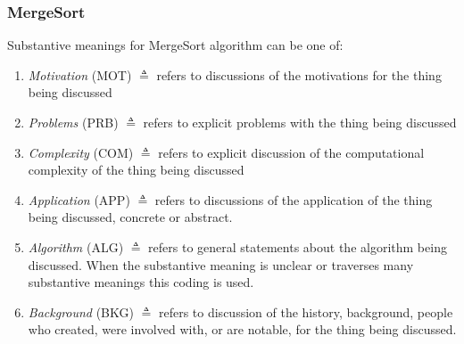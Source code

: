 \documentclass[10pt, letterpaper]{article}
\begin{document}
\subsubsection*{MergeSort}
\label{sec:orgf8d5264}
Substantive meanings for MergeSort algorithm can be one of:
\begin{enumerate}
\item \emph{Motivation} (MOT) \(\triangleq\) refers to discussions of the motivations for the thing being discussed
\item \emph{Problems} (PRB) \(\triangleq\) refers to explicit problems with the thing being discussed
\item \emph{Complexity} (COM) \(\triangleq\) refers to explicit discussion of the computational complexity of the thing being discussed
\item \emph{Application} (APP) \(\triangleq\) refers to discussions of the application of the thing being discussed, concrete or abstract.
\item \emph{Algorithm} (ALG) \(\triangleq\) refers to general statements about the algorithm being discussed. When the substantive meaning is unclear or traverses many substantive meanings this coding is used.
\item \emph{Background} (BKG) \(\triangleq\) refers to discussion of the history, background, people who created, were involved with, or are notable, for the thing being discussed.
\end{enumerate}
\end{document}
